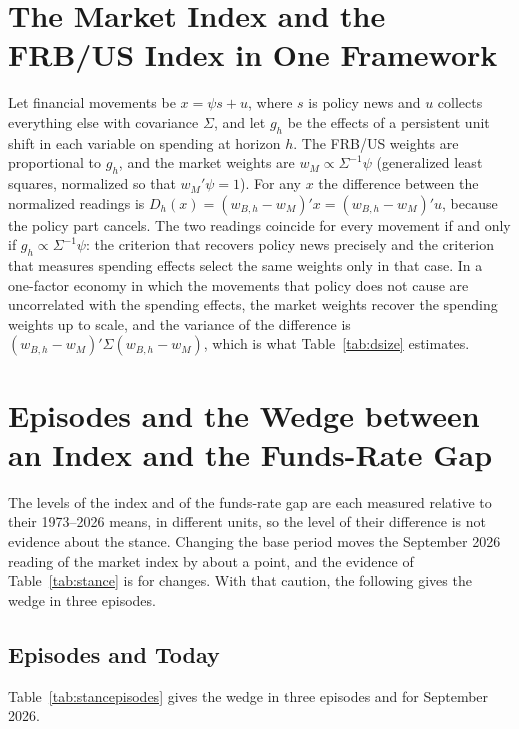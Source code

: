 \documentclass[11pt]{article}
\begin{document}



\FloatBarrier
\newpage
\begin{appendices}
\renewcommand{\thetable}{\Alph{section}\arabic{table}}
\renewcommand{\thefigure}{\Alph{section}\arabic{figure}}
\FloatBarrier


\section{The Market Index and the FRB/US Index in One Framework}\label{app:ma}
Let financial movements be $x=\psi s+u$, where $s$ is policy news and $u$ collects everything else with covariance $\Sigma$, and let $g_h$ be the effects of a persistent unit shift in each variable on spending at horizon $h$. The FRB/US weights are proportional to $g_h$, and the market weights are $w_M\propto\Sigma^{-1}\psi$ (generalized least squares, normalized so that $w_M'\psi=1$). For any $x$ the difference between the normalized readings is $D_h(x)=(w_{B,h}-w_M)'x=(w_{B,h}-w_M)'u$, because the policy part cancels. The two readings coincide for every movement if and only if $g_h\propto\Sigma^{-1}\psi$: the criterion that recovers policy news precisely and the criterion that measures spending effects select the same weights only in that case. In a one-factor economy in which the movements that policy does not cause are uncorrelated with the spending effects, the market weights recover the spending weights up to scale, and the variance of the difference is $(w_{B,h}-w_M)'\Sigma(w_{B,h}-w_M)$, which is what Table~\ref{tab:dsize} estimates.

\section{Episodes and the Wedge between an Index and the Funds-Rate Gap}\label{app:episodes}
The levels of the index and of the funds-rate gap are each measured relative to their 1973--2026 means, in different units, so the level of their difference is not evidence about the stance. Changing the base period moves the September 2026 reading of the market index by about a point, and the evidence of Table~\ref{tab:stance} is for changes. With that caution, the following gives the wedge in three episodes.
\subsection{Episodes and Today}\label{sec:episodes}
Table~\ref{tab:stancepisodes} gives the wedge in three episodes and for September 2026.


\end{appendices}
\end{document}
